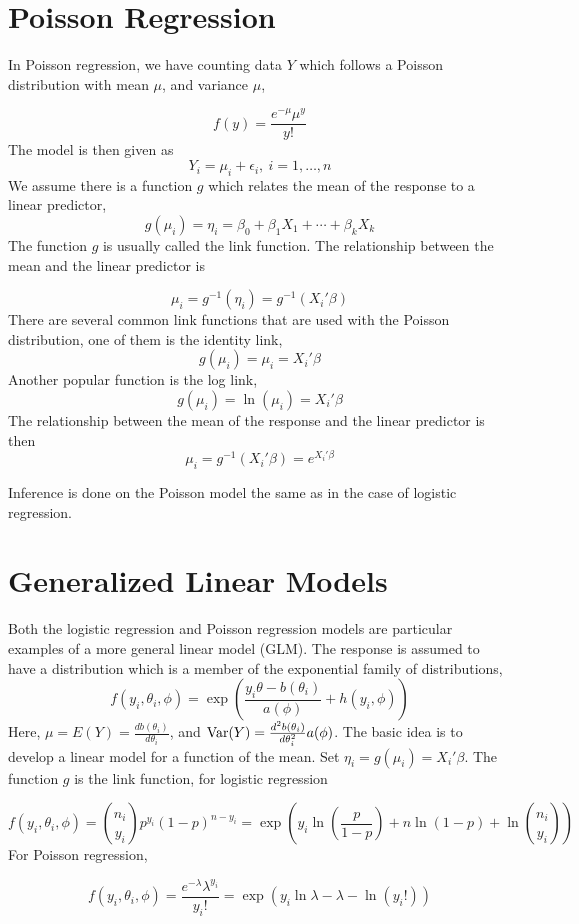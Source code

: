 \section{Poisson Regression}

In Poisson regression, we have counting data $Y$ which follows a Poisson distribution with mean $\mu$, and variance $\mu$, 

\[f(y) = \frac{e^{-\mu}\mu^y}{y!}\]
The model is then given as 
\[Y_i = \mu_i + \epsilon_i, \ i = 1, \ldots, n\]
We assume there is a function $g$ which relates the mean of the response to a linear predictor,
\[g(\mu_i) = \eta_i = \beta_0 + \beta_1X_1 + \cdots + \beta_kX_k\]
The function $g$ is usually called the link function. The relationship between the mean and the linear predictor is 

\[\mu_i = g^{-1}(\eta_i) = g^{-1}(X_i'\beta)\]
There are several common link functions that are used with the Poisson distribution, one of them is the identity link, 
\[g(\mu_i) = \mu_i = X_i'\beta\]
Another popular function is the log link,
\[g(\mu_i) = \ln(\mu_i) = X_i'\beta\]
The relationship between the mean of the response and the linear predictor is then 
\[\mu_i = g^{-1}(X_i'\beta) = e^{X_i'\beta}\]

Inference is done on the Poisson model the same as in the case of logistic regression. 

\section{Generalized Linear Models}

Both the logistic regression and Poisson regression models are particular examples of a more general linear model (GLM). The response is assumed to have a distribution which is a member of the exponential family of distributions, 
\[f(y_i, \theta_i, \phi) = \exp\left(\frac{y_i\theta - b(\theta_i)}{a(\phi)} + h(y_i, \phi)\right)\]
Here, $\mu = E(Y) = \frac{db(\theta_i)}{d\theta_i}$, and $\operatorname{Var}(Y) = \frac{d^2b(\theta_i)}{d\theta_i^2}a(\phi)$. The basic idea is to develop a linear model for a function of the mean. Set $\eta_i = g(\mu_i) = X_i'\beta$. The function $g$ is the link function, for logistic regression 

\[f(y_i,\theta_i, \phi) = {n_i \choose y_i}p^{y_i}(1-p)^{n-y_i} = \exp\left(y_i \ln\left(\frac{p}{1-p}\right) + n\ln (1-p) + \ln{n_i \choose y_i}\right)\]
For Poisson regression,

\[f(y_i, \theta_i, \phi) = \frac{e^{-\lambda}\lambda^{y_i}}{y_i!}= \exp\left(y_i\ln \lambda - \lambda - \ln(y_i!)\right)\]